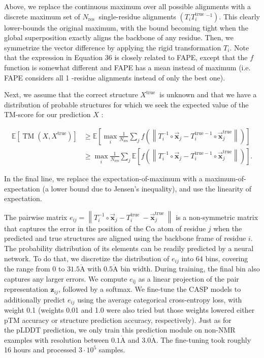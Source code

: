 \documentclass[10pt]{article}
\def\AA{\mathring{\mathrm{A}}}
\begin{document}
Above, we replace the continuous maximum over all possible alignments with a discrete maximum set of $N_{\text {res }}$ single-residue alignments $\left(T_{i} T_{i}^{\text {true }}{ }^{-1}\right)$. This clearly lower-bounds the original maximum, with the bound becoming tight when the global superposition exactly aligns the backbone of any residue. Then, we symmetrize the vector difference by applying the rigid transformation $T_{i}$. Note that the expression in Equation 36 is closely related to FAPE, except that the $f$ function is somewhat different and FAPE has a mean instead of maximum (i.e. FAPE considers all 1 -residue alignments instead of only the best one).

Next, we assume that the correct structure $X^{\text {true }}$ is unknown and that we have a distribution of probable structures for which we seek the expected value of the TM-score for our prediction $X$ :


\begin{align*}
\mathbb{E}\left[\operatorname{TM}\left(X, X^{\mathrm{true}}\right)\right] & \geq \mathbb{E}\left[\max _{i} \frac{1}{N_{\mathrm{res}}} \sum_{j} f\left(\left\|T_{i}^{-1} \circ \overrightarrow{\mathbf{x}}_{j}-T_{i}^{\mathrm{true}-1} \circ \overrightarrow{\mathbf{x}}_{j}^{\mathrm{true}}\right\|\right)\right]  \tag{37}\\
& \geq \max _{i} \frac{1}{N_{\mathrm{res}}} \sum_{j} \mathbb{E}\left[f\left(\left\|T_{i}^{-1} \circ \overrightarrow{\mathbf{x}}_{j}-T_{i}^{\mathrm{true}-1} \circ \overrightarrow{\mathbf{x}}_{j}^{\mathrm{true}}\right\|\right)\right] . \tag{38}
\end{align*}


In the final line, we replace the expectation-of-maximum with a maximum-of-expectation (a lower bound due to Jensen's inequality), and use the linearity of expectation.

The pairwise matrix $e_{i j}=\left\|T_{i}^{-1} \circ \overrightarrow{\mathbf{x}}_{j}-T_{i}^{\text {true }}-\overrightarrow{\mathbf{x}}_{j}^{\text {true }}\right\|$ is a non-symmetric matrix that captures the error in the position of the $\mathrm{C} \alpha$ atom of residue $j$ when the predicted and true structures are aligned using the backbone frame of residue $i$. The probability distribution of its elements can be readily predicted by a neural network. To do that, we discretize the distribution of $e_{i j}$ into 64 bins, covering the range from 0 to $31.5 \AA$ with $0.5 \AA$ bin width. During training, the final bin also captures any larger errors. We compute $e_{\mathrm{ij}}$ as a linear projection of the pair representation $\mathbf{z}_{i j}$, followed by a softmax. We fine-tune the CASP models to additionally predict $e_{i j}$ using the average categorical cross-entropy loss, with weight 0.1 (weights 0.01 and 1.0 were also tried but those weights lowered either pTM accuracy or structure prediction accuracy, respectively). Just as for\\
the pLDDT prediction, we only train this prediction module on non-NMR examples with resolution between $0.1 \AA$ and $3.0 \AA$. The fine-tuning took roughly 16 hours and processed $3 \cdot 10^{5}$ samples.
\end{document}
